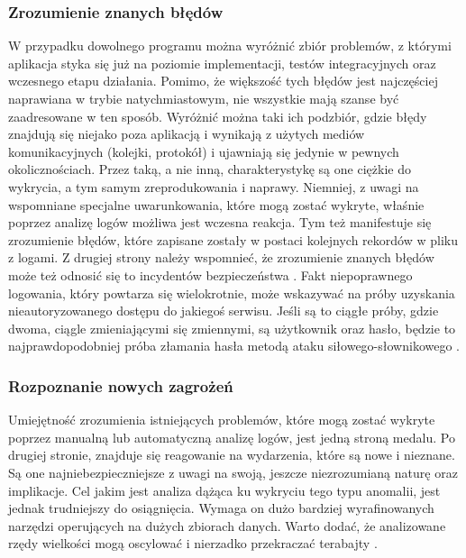         \subsubsection{Zrozumienie znanych błędów}
        W przypadku dowolnego programu można wyróżnić zbiór problemów,
        z którymi aplikacja styka się już na poziomie implementacji,
        testów integracyjnych oraz wczesnego etapu działania. Pomimo, że większość tych błędów jest najczęściej
        naprawiana w trybie natychmiastowym, nie wszystkie mają szanse być zaadresowane w ten sposób.
        Wyróżnić można taki ich podzbiór, gdzie błędy znajdują się niejako poza aplikacją i wynikają z użytych
        mediów komunikacyjnych (kolejki, protokół) i ujawniają się jedynie w pewnych okolicznościach.
        Przez taką, a nie inną, charakterystykę są one ciężkie do wykrycia, a tym samym zreprodukowania i naprawy.
        Niemniej, z uwagi na wspomniane specjalne uwarunkowania, które mogą zostać wykryte, właśnie poprzez analizę logów
        możliwa jest wczesna reakcja. Tym też manifestuje się zrozumienie błędów, które zapisane zostały
        w postaci kolejnych rekordów w pliku z logami. 
        Z drugiej strony należy wspomnieć, że zrozumienie znanych błędów może też odnosić się to incydentów
        bezpieczeństwa . Fakt niepoprawnego logowania, który powtarza się wielokrotnie, może wskazywać na próby
        uzyskania nieautoryzowanego dostępu do jakiegoś serwisu. Jeśli są to ciągłe próby, gdzie dwoma, ciągle
        zmieniającymi się zmiennymi, są użytkownik oraz hasło, będzie to najprawdopodobniej próba złamania hasła
        metodą ataku siłowego-słownikowego \cite{logging_log_management}. 
        
        \subsubsection{Rozpoznanie nowych zagrożeń}
        Umiejętność zrozumienia istniejących problemów, które mogą zostać wykryte poprzez manualną lub
        automatyczną analizę logów, jest jedną stroną medalu. Po drugiej stronie, znajduje się reagowanie
        na wydarzenia, które są nowe i nieznane. Są one najniebezpieczniejsze z uwagi na swoją, 
        jeszcze niezrozumianą naturę oraz implikacje. Cel jakim jest analiza dążąca ku wykryciu tego
        typu anomalii, jest jednak trudniejszy do osiągnięcia. Wymaga on dużo bardziej wyrafinowanych narzędzi
        operujących na dużych zbiorach danych. Warto dodać, że analizowane rzędy wielkości mogą oscylować i 
        nierzadko przekraczać terabajty \cite{logging_log_management}. 
        
